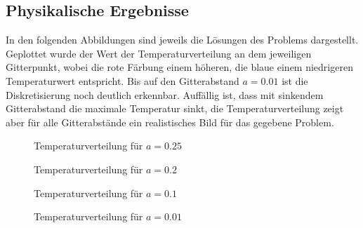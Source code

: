 \documentclass[10pt,a4paper]{article}
\begin{document}
\subsection{Physikalische Ergebnisse}
In den folgenden Abbildungen sind jeweils die Lösungen des Problems dargestellt. Geplottet wurde der Wert der Temperaturverteilung an dem jeweiligen Gitterpunkt, wobei die rote Färbung einem höheren, die blaue einem niedrigeren Temperaturwert entspricht. Bis auf den Gitterabstand $a=\num{0,01}$ ist die Diskretisierung noch deutlich erkennbar.
Auffällig ist, dass mit sinkendem Gitterabstand die maximale Temperatur sinkt, die Temperaturverteilung zeigt aber für alle Gitterabstände ein realistisches Bild für das gegebene Problem.
\begin{figure}[htbp!]
\begin{minipage}[c]{0.5\linewidth}
\centering
\vspace{-40pt}
\scalebox{0.85}{}
\vspace{-40pt}
\caption{Temperaturverteilung für $a=\num{0,25}$}
\label{fig:a_25}
\end{minipage}
\begin{minipage}[c]{0.5\linewidth}
\centering
\vspace{-40pt}
\scalebox{0.85}{}
\vspace{-40pt}
\caption{Temperaturverteilung für $a=\num{0,2}$}
\label{fig:a_20}
\end{minipage}
\begin{minipage}[c]{0.5\linewidth}
\centering
\vspace{-40pt}
\scalebox{0.85}{}
\vspace{-40pt}
\caption{Temperaturverteilung für $a=\num{0,1}$}
\label{fig:a_10}
\end{minipage}
\begin{minipage}[c]{0.5\linewidth}
\centering
\vspace{-40pt}
\scalebox{0.85}{}
\vspace{-40pt}
\caption{Temperaturverteilung für $a=\num{0,01}$}
\label{fig:a_1}
\end{minipage}
\end{figure}
\end{document}
